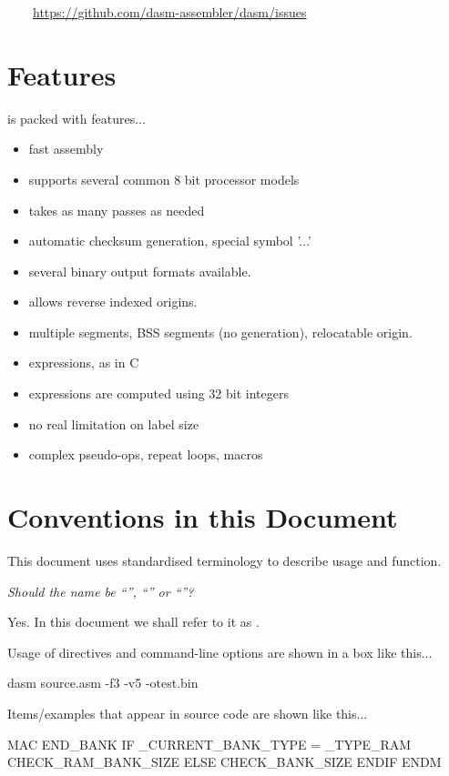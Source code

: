 ~~~~\url{https://github.com/dasm-assembler/dasm/issues}


\section{Features}

\dasm is packed with features...

\begin{itemize}
	\item fast assembly
\item supports several common 8 bit processor models
\item takes as many passes as needed
\item automatic checksum generation, special symbol '...'
\item several binary output formats available.
\item allows reverse indexed origins.
\item multiple segments, BSS segments (no generation), relocatable origin.
\item expressions, as in C
\item expressions are computed using 32 bit integers
\item no real limitation on label size
\item complex pseudo-ops, repeat loops, macros
\end{itemize}


\section{Conventions in this Document}

This document uses standardised terminology to describe usage and function.

\textit{Should the name be ``'', ``'' or ``''?}

Yes. In this document we shall refer to it as \dasm.

Usage of directives and command-line options are shown in a box like this...

\begin{usage}
dasm source.asm -f3 -v5 -otest.bin
\end{usage}

Items/examples that appear in source code are shown like this...

\begin{code}
  MAC END_BANK
    IF _CURRENT_BANK_TYPE = _TYPE_RAM
      CHECK_RAM_BANK_SIZE
    ELSE
      CHECK_BANK_SIZE
    ENDIF
  ENDM
\end{code}

